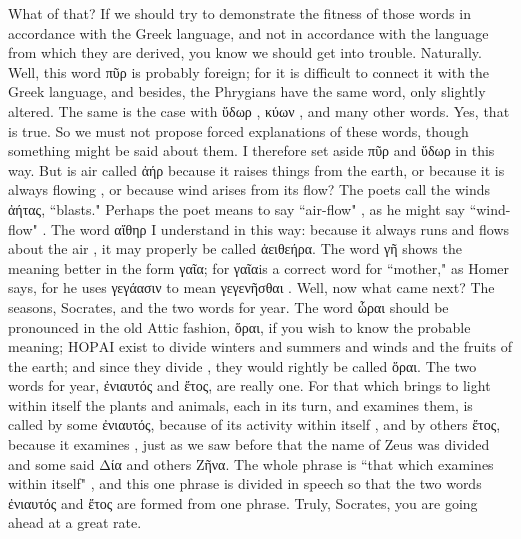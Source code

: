 {{{{\hermogenesspeaks
What of that?
\socratesspeaks
If we should try to demonstrate the fitness of those words in accordance with the Greek language, and not in accordance with the language from which they are derived, you know we should get into trouble.
\hermogenesspeaks
Naturally. 
\socratesspeaks
Well, this word πῦρ is probably foreign; for it is difficult to connect it with the Greek language, and besides, the Phrygians have the same word, only slightly altered. The same is the case with ὕδωρ , κύων , and many other words.
\hermogenesspeaks
Yes, that is true.
\socratesspeaks
So we must not propose forced explanations of these words, though something might be said about them. I therefore set aside πῦρ and ὕδωρ in this way.  But is air called ἀήρ because it raises  things from the earth, or because it is always flowing , or because wind arises from its flow? The poets call the winds ἀήτας, ``blasts." Perhaps the poet means to say ``air-flow" , as he might say ``wind-flow" . The word αἴθηρ  I understand in this way: because it always runs and flows about the air , it may properly be called ἀειθεήρα. The word γῆ  shows the meaning better  in the form γαῖα; for γαῖαis a correct word for ``mother," as Homer says, for he uses γεγάασιν to mean γεγενῆσθαι . Well, now what came next?
\hermogenesspeaks
The seasons, Socrates, and the two words for year.
\socratesspeaks
The word ὧραι  should be pronounced in the old Attic fashion, ὅραι, if you wish to know the probable meaning; ΗΟΡΑΙ exist to divide winters and summers and winds and the fruits of the earth; and since they divide , they would rightly be called ὅραι.  The two words for year, ἐνιαυτός and ἔτος, are really one. For that which brings to light within itself the plants and animals, each in its turn, and examines them, is called by some ἐνιαυτός, because of its activity within itself , and by others ἔτος, because it examines , just as we saw before that the name of Zeus was divided and some said Δία and others Ζῆνα. The whole phrase is ``that which examines within itself" , and this one phrase is divided in speech so that the two words ἐνιαυτός and ἔτος  are formed from one phrase.
\hermogenesspeaks
Truly, Socrates, you are going ahead at a great rate.
\socratesspeaks
}}}}
